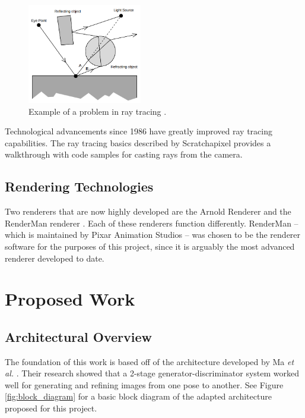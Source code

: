 \documentclass[conference]{IEEEtran}
\begin{document}
\begin{figure}[htbp]
\centerline{\includegraphics[width=5cm]{raytrace.png}}
\caption{Example of a problem in ray tracing \cite{backwards_raytrace}.}
\label{fig:raytrace}
\end{figure}

Technological advancements since 1986 have greatly improved ray tracing capabilities.
The ray tracing basics described by Scratchapixel \cite{raytrace_walkthrough}
provides a walkthrough with code samples for casting rays from the camera.

\subsection{Rendering Technologies}
Two renderers that are now highly developed are the Arnold Renderer \cite{arnold}
and the RenderMan renderer \cite{renderman}. Each of these renderers
function differently.
RenderMan -- which is maintained by Pixar Animation Studios --
was chosen to be the renderer software for the purposes of this project,
since it is arguably the most advanced renderer developed to date.

\section{Proposed Work}
\label{sec:proposed_work}
\subsection{Architectural Overview}
\label{subsec:architecture}
The foundation of this work is based off of the architecture
developed by Ma \textit{et al.} \cite{pose_guided_image_generation}.
Their research showed that a 2-stage generator-discriminator system worked well for generating
and refining images from one pose to another.
See Figure \ref{fig:block_diagram} for a basic block diagram of the adapted architecture
proposed for this project.
\end{document}
